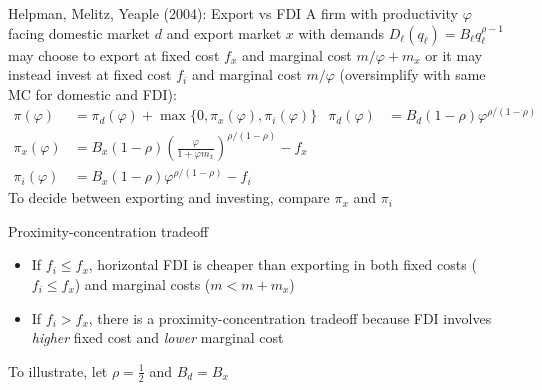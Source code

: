 \documentclass[10pt,notes=hide]{beamer}
\begin{document}
\begin{frame}{Helpman, Melitz, Yeaple (2004): Export vs FDI}
{\small A firm with productivity $\varphi$ facing domestic market $d$ and export market $x$ with demands $D_{\ell}(q_\ell) = B_\ell q_\ell^{\rho-1}$
may choose to export at fixed cost $f_x$ and marginal cost $m/\varphi + m_x$ or it may instead invest at fixed cost $f_i$ and marginal cost $m/\varphi$ (oversimplify with same MC for domestic and FDI):} 
\begin{align*}
\pi(\varphi) &= \pi_d(\varphi) + \max\{0,\pi_x(\varphi),\pi_i(\varphi) \} 
&
\pi_d (\varphi) &= B_d \left(1-\rho\right) \varphi^{\rho/(1-\rho)}
\\
\pi_x (\varphi) &= B_x \left(1-\rho\right) \left(\frac{\varphi}{1+\varphi m_x}\right)^{\rho/(1-\rho)} - f_x
\\
\pi_i (\varphi) &= B_x \left(1-\rho\right) \varphi^{\rho/(1-\rho)} - f_i
\end{align*}
To decide between exporting and investing, compare $\pi_x$ and $\pi_i$
\end{frame}
\begin{frame}{Proximity-concentration tradeoff}
\begin{itemize}
  \item If $f_i\leq f_x$, horizontal FDI is cheaper than exporting in both fixed costs ($f_i \leq f_x$) and marginal costs ($m < m + m_x$)
  \item If $f_i > f_x$, there is a proximity-concentration tradeoff because FDI involves \emph{higher} fixed cost and \emph{lower} marginal cost
\end{itemize}
To illustrate, let $\rho = \frac{1}{2}$ and $B_d = B_x$
\begin{center}
\end{center}
\end{frame}
\end{document}
